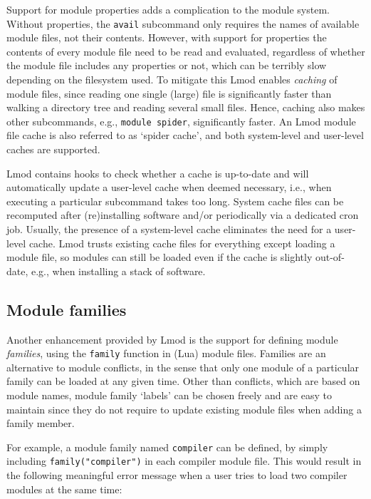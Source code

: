 Support for module properties adds a complication to the module
system.  Without properties, the \texttt{\small avail} subcommand only requires the
names of available module files, not their contents.  However, with support for
properties the contents of every module file need to be read and evaluated,
regardless of whether the module file includes any properties or not, which can
be terribly slow depending on the filesystem used.  To mitigate this Lmod enables
\emph{caching} of module files, since reading one single (large) file is
significantly faster than walking a directory tree and reading several small files.
Hence, caching also makes other subcommands, e.g., \texttt{\small module spider},
significantly faster. An Lmod module file cache is also referred to as
`spider cache', and both system-level and user-level caches are supported.

Lmod contains hooks to check whether a cache is up-to-date and will automatically
update a user-level cache when deemed necessary, i.e., when executing a particular
subcommand takes too long. System cache files can be recomputed after (re)installing software and/or periodically via a dedicated cron job. Usually, the presence of a
system-level cache eliminates the need for a user-level cache.
Lmod trusts existing cache files for everything except loading a module
file, so modules can still be loaded even if the cache is slightly out-of-date,
e.g., when installing a stack of software.


\subsection{Module families}

Another enhancement provided by Lmod is the support for defining module
\emph{families}, using the \texttt{\small family} function in (Lua) module files.
Families are an alternative to module conflicts, in the sense that only one module of
a particular family can be loaded at any given time. Other than conflicts, which
are based on module names, module family `labels' can be chosen freely and are easy
to maintain since they do not require to update existing module files when adding a
family member.

For example, a module family named \texttt{\small compiler} can be defined, by
simply including \texttt{\small family("compiler")} in each compiler module file.
This would result in the following meaningful error message when a user tries to
load two compiler modules at the same time:

